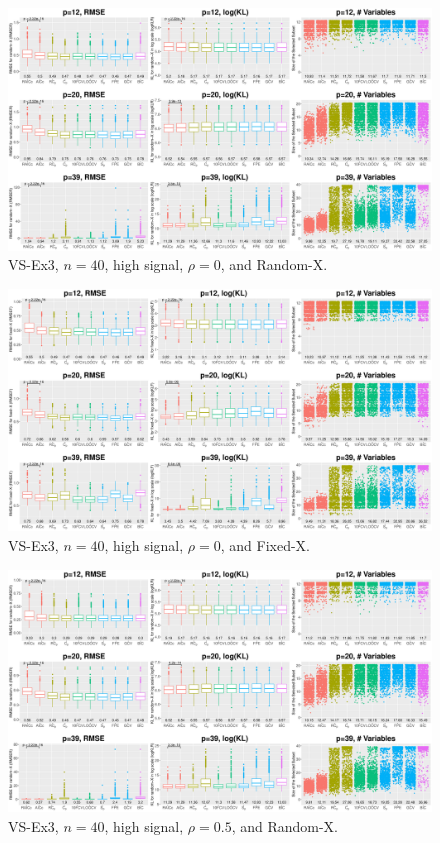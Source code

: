 \clearpage
\begin{figure}[!ht]
\centering
\includegraphics[width=\textwidth]{figures/supplement/randomx_VS-Ex3_n40_hsnr_rho0.eps}
\caption{VS-Ex3, $n=40$, high signal, $\rho=0$, and Random-X.}
\end{figure}
\begin{figure}[!ht]
\centering
\includegraphics[width=\textwidth]{figures/supplement/fixedx_VS-Ex3_n40_hsnr_rho0.eps}
\caption{VS-Ex3, $n=40$, high signal, $\rho=0$, and Fixed-X.}
\end{figure}
\clearpage
\begin{figure}[!ht]
\centering
\includegraphics[width=\textwidth]{figures/supplement/randomx_VS-Ex3_n40_hsnr_rho05.eps}
\caption{VS-Ex3, $n=40$, high signal, $\rho=0.5$, and Random-X.}
\end{figure}
